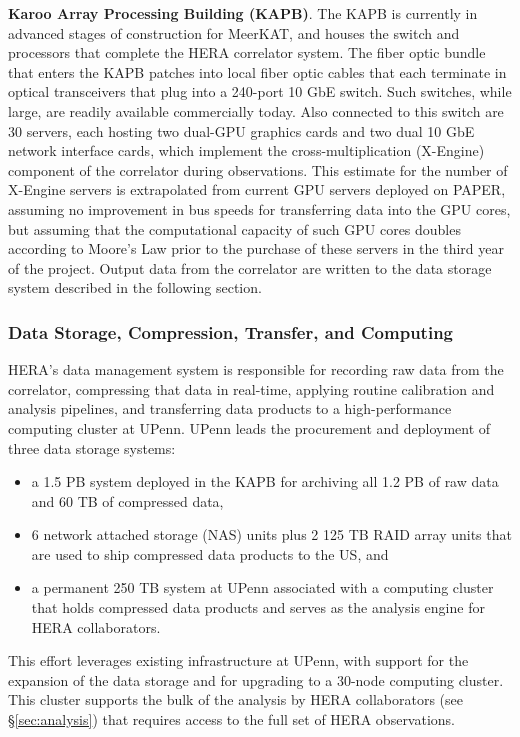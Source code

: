 \documentclass[preprint]{aastex}
\newcommand{\compress}{\vspace{-0.25in}}
\begin{document}
{\bf Karoo Array Processing Building (KAPB)}.
The KAPB is currently
in advanced stages of construction for MeerKAT, and houses the switch and processors
that 
complete the HERA correlator system.  The fiber optic bundle that enters the KAPB patches
into local fiber optic cables 
that each terminate in optical transceivers that plug into a 240-port 10 GbE switch.
Such switches, while large, are readily available commercially today.  Also connected to
this switch are 30 servers, each hosting two dual-GPU graphics cards and two dual
10 GbE network interface cards, which implement the cross-multiplication (X-Engine) component
of the correlator during observations.  This estimate for the number of X-Engine servers
is extrapolated from current GPU servers deployed on PAPER, assuming no improvement in bus
speeds for transferring data into the GPU cores, but assuming that the computational
capacity of such GPU cores doubles according to Moore's Law prior to the purchase of
these servers in the third year of the project.
Output data from the correlator are written to the data storage system described
in the following section.


\compress
\subsubsection{Data Storage, Compression, Transfer, and Computing}
\label{sec:data}

HERA's data management system is responsible for recording raw data from the
correlator, compressing that data in real-time, applying routine calibration
and analysis pipelines, and transferring data products to 
a high-performance computing cluster at UPenn.
UPenn leads the procurement
and deployment of three data storage systems:
\begin{itemize}[noitemsep,nolistsep]
\item a 1.5 PB system deployed in the KAPB for archiving all 1.2 PB of raw data and 60 TB of compressed data, 
\item 6 network attached storage (NAS) units plus 2 125 TB RAID array units that are used to ship compressed data products to the US, and
\item a permanent 250 TB system at UPenn associated with a computing cluster that
holds compressed data products and serves as the analysis engine for HERA collaborators.
\end{itemize}
\noindent
This effort leverages existing infrastructure at UPenn, with support
for the expansion of the data storage and for upgrading to a 30-node computing cluster.  This cluster supports the bulk of the analysis by HERA collaborators (see \S\ref{sec:analysis}) that requires access to the full set of HERA observations.
\end{document}
